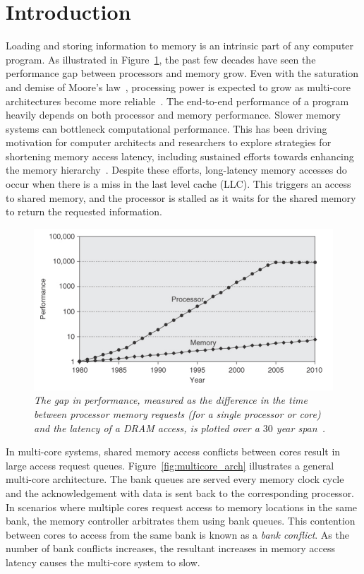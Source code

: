 \section{Introduction}
\label{sec:intro}
Loading and storing information to memory is an intrinsic part of any computer program. As illustrated in Figure~\ref{fig:cpuvsmemory}, the past few decades have seen the performance gap between processors and memory grow. Even with the saturation and demise of Moore's law~\cite{Wulf1995, waldrop2016, MooreMITR}, processing power is expected to grow as multi-core architectures become more reliable~\cite{Geer}. The end-to-end performance of a program heavily depends on both processor and memory performance. Slower memory systems can bottleneck computational performance. This has been driving motivation for computer architects and researchers to explore strategies for shortening memory access latency, including sustained efforts towards enhancing the memory hierarchy~\cite{Burger}. Despite these efforts, long-latency memory accesses do occur when there is a miss in the last level cache (LLC). This triggers an access to shared memory, and the processor is stalled as it waits for the shared memory to return the requested information.
\begin{figure}[t!]
\centering
\includegraphics[width=0.7\linewidth]{fig/cpuvsmemory.jpg}
\caption{\it{The gap in performance, measured as the difference in the time 
between processor memory requests (for a single processor or core) and the 
latency of a DRAM access, is plotted over a $30$ year span~\cite{comparchbook}.}}
\label{fig:cpuvsmemory}
\end{figure}
In multi-core systems, shared memory access conflicts between cores result in large access request queues. Figure~\ref{fig:multicore_arch}  illustrates a general multi-core architecture. The bank queues are served every memory clock cycle and the acknowledgement with data is sent back to the corresponding processor. In scenarios where multiple cores request access to memory locations in the same bank, the memory controller arbitrates them using bank queues. This contention between cores to access from the same bank is known as a {\em bank conflict}. As the number of bank conflicts increases, the resultant increases in memory access latency causes the multi-core system to slow.

